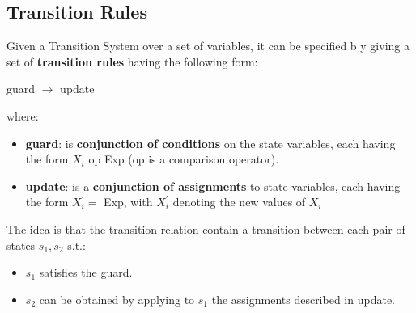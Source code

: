 \subsection{Transition Rules}
Given a Transition System over a set of variables, it can be specified b y giving a set of \textbf{transition rules} having the following form:
\begin{center}
    guard $\rightarrow$ update
\end{center}
where:
\begin{itemize}
    \item \textbf{guard}: is \textbf{conjunction of conditions} on the state variables, each having the form $X_i$ op Exp (op is a comparison operator).
    \item \textbf{update}: is a \textbf{conjunction of assignments} to state variables, each having the form $X^{'}_{i} = $ Exp, with $X^{'}_{i}$ denoting the new values of $X_i$ 
\end{itemize}

The idea is that the transition relation contain a transition between each pair of states $s_1, s_2$ s.t.:
\begin{itemize}
    \item $s_1$ satisfies the guard.
    \item  $s_2$ can be obtained by applying to $s_1$ the assignments described in update.
\end{itemize}


